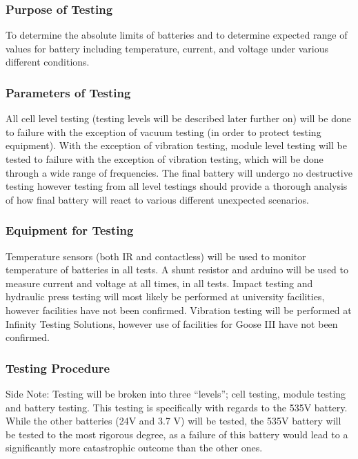 \documentclass{report}
\begin{document}
    \subsubsection{Purpose of Testing}
    To determine the absolute limits of batteries and to determine expected range of values for battery including temperature, current, and voltage under various different conditions.
    \subsubsection{Parameters of Testing}
    All cell level testing (testing levels will be described later further on) will be done to failure with the exception of vacuum testing (in order to protect testing equipment). With the exception of vibration testing, module level testing will be tested to failure with the exception of vibration testing, which will be done through a wide range of frequencies. The final battery will undergo no destructive testing however testing from all level testings should provide a thorough analysis of how final battery will react to various different unexpected scenarios.
    \subsubsection{Equipment for Testing}
    Temperature sensors (both IR and contactless) will be used to monitor temperature of batteries in all tests. A shunt resistor and arduino will be used to measure current and voltage at all times, in all tests. Impact testing and hydraulic press testing will most likely be performed at university facilities, however facilities have not been confirmed. Vibration testing will be performed at Infinity Testing Solutions, however use of facilities for Goose III have not been confirmed.
    \subsubsection{Testing Procedure}
    Side Note: Testing will be broken into three “levels”; cell testing, module testing and battery testing. This testing is specifically with regards to the 535V battery. While the other batteries (24V and 3.7 V) will be tested, the 535V battery will be tested to the most rigorous degree, as a failure of this battery would lead to a significantly more catastrophic outcome than the other ones.
    
\end{document}

